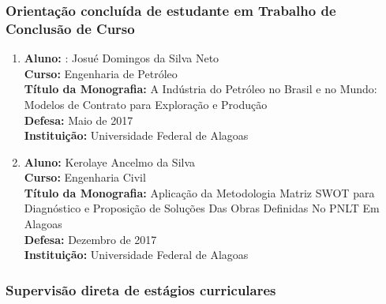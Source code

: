 \documentclass[a4paper,oneside,10pt]{article}
\begin{document}
\subsubsection{Orientação concluída de estudante em Trabalho de Conclusão de Curso}
\vspace{0.3cm}

\begin{enumerate}
\renewcommand{\labelenumi}{{\large\bfseries\arabic{enumi}.}}

\item  \textbf{Aluno:} : Josué Domingos da Silva Neto \mbox{}\\
            \textbf{Curso:} Engenharia de Petróleo\\
            \textbf{Título da Monografia:} A Indústria do Petróleo no Brasil e no Mundo: Modelos de Contrato para Exploração e Produção \\
            \textbf{Defesa:} Maio de 2017\\
            \textbf{Instituição:} Universidade Federal de Alagoas
            
\item  \textbf{Aluno:} Kerolaye Ancelmo da Silva \mbox{}\\
            \textbf{Curso:} Engenharia Civil\\
            \textbf{Título da Monografia:} Aplicação da Metodologia Matriz SWOT para Diagnóstico e Proposição de Soluções Das Obras Definidas No PNLT Em Alagoas\\
            \textbf{Defesa:} Dezembro de 2017\\
            \textbf{Instituição:} Universidade Federal de Alagoas
\end{enumerate}


\subsubsection{Supervisão direta de estágios curriculares}
\vspace{0.3cm}
\end{document}
